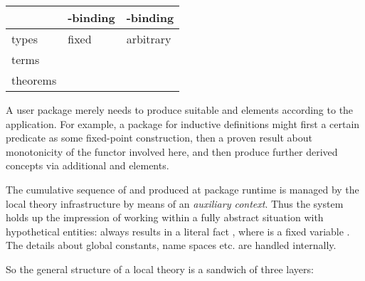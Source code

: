 \begin{isabellebody}
\begin{isamarkuptext}
  \begin{center}
  \begin{tabular}{|l|l|l|}
  \hline
  & \isa{{\isasymlambda}}-binding & \isa{let}-binding \\
  \hline
  types & fixed \isa{{\isasymalpha}} & arbitrary \isa{{\isasymbeta}} \\
  terms & \isa{{\isasymFIX}\ x\ {\isacharcolon}{\isacharcolon}\ {\isasymtau}} & \isa{{\isasymDEFINE}\ c\ {\isasymequiv}\ t} \\
  theorems & \isa{{\isasymASSUME}\ a{\isacharcolon}\ A} & \isa{{\isasymNOTE}\ b\ {\isacharequal}\ \isactrlBG B\isactrlEN } \\
  \hline
  \end{tabular}
  \end{center}

  A user package merely needs to produce suitable \isa{{\isasymDEFINE}}
  and \isa{{\isasymNOTE}} elements according to the application.  For
  example, a package for inductive definitions might first \isa{{\isasymDEFINE}} a certain predicate as some fixed-point construction,
  then \isa{{\isasymNOTE}} a proven result about monotonicity of the
  functor involved here, and then produce further derived concepts via
  additional \isa{{\isasymDEFINE}} and \isa{{\isasymNOTE}} elements.

  The cumulative sequence of \isa{{\isasymDEFINE}} and \isa{{\isasymNOTE}}
  produced at package runtime is managed by the local theory
  infrastructure by means of an \emph{auxiliary context}.  Thus the
  system holds up the impression of working within a fully abstract
  situation with hypothetical entities: 
  always results in a literal fact , where
   is a fixed variable .  The details about
  global constants, name spaces etc. are handled internally.

  So the general structure of a local theory is a sandwich of three
  layers:

  \begin{center}
  \end{center}


\end{isamarkuptext}
\end{isabellebody}

